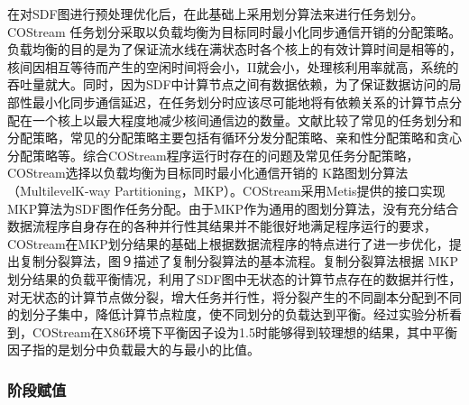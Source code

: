 在对SDF图进行预处理优化后，在此基础上采用划分算法来进行任务划分。COStream 任务划分采取以负载均衡为目标同时最小化同步通信开销的分配策略。负载均衡的目的是为了保证流水线在满状态时各个核上的有效计算时间是相等的，核间因相互等待而产生的空闲时间将会小，II就会小，处理核利用率就高，系统的吞吐量就大。同时，因为SDF中计算节点之间有数据依赖，为了保证数据访问的局部性最小化同步通信延迟，在任务划分时应该尽可能地将有依赖关系的计算节点分配在一个核上以最大程度地减少核间通信边的数量。文献比较了常见的任务划分和分配策略，常见的分配策略主要包括有循环分发分配策略、亲和性分配策略和贪心分配策略等。综合COStream程序运行时存在的问题及常见任务分配策略，COStream选择以负载均衡为目标同时最小化通信开销的 K路图划分算法（MultilevelK-way Partitioning，MKP）。COStream采用Metis提供的接口实现MKP算法为SDF图作任务分配。由于MKP作为通用的图划分算法，没有充分结合数据流程序自身存在的各种并行性其结果并不能很好地满足程序运行的要求，COStream在MKP划分结果的基础上根据数据流程序的特点进行了进一步优化，提出复制分裂算法，图９描述了复制分裂算法的基本流程。复制分裂算法根据 MKP 划分结果的负载平衡情况，利用了SDF图中无状态的计算节点存在的数据并行性，对无状态的计算节点做分裂，增大任务并行性，将分裂产生的不同副本分配到不同的划分子集中，降低计算节点粒度，使不同划分的负载达到平衡。经过实验分析看到，COStream在X86环境下平衡因子设为1.5时能够得到较理想的结果，其中平衡因子指的是划分中负载最大的与最小的比值。

\subsubsection{阶段赋值}

